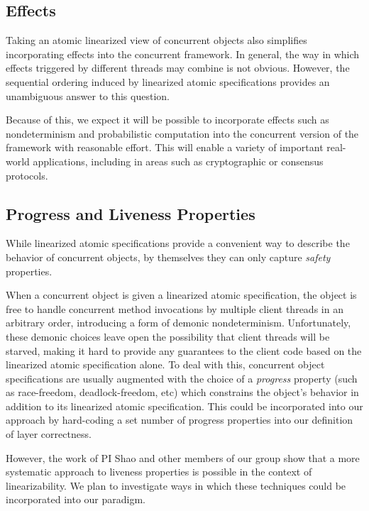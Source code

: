 \subsection{Effects}

Taking an atomic linearized view of concurrent objects
also simplifies incorporating effects into the concurrent framework.
In general,
the way in which effects triggered by different threads may combine
is not obvious.
However,
the sequential ordering induced by linearized atomic specifications
provides an unambiguous answer to this question.

Because of this,
we expect it will be possible to incorporate
effects such as nondeterminism and probabilistic computation
into the concurrent version of the framework
with reasonable effort.
This will enable a variety of important real-world applications,
including in areas such as cryptographic or consensus protocols.


\subsection{Progress and Liveness Properties}

While linearized atomic specifications
provide a convenient way to describe the behavior of concurrent objects,
by themselves they can only capture \emph{safety} properties.

When a concurrent object is given a linearized atomic specification,
the object is free to handle
concurrent method invocations by multiple client threads
in an arbitrary order,
introducing a form of demonic nondeterminism.
Unfortunately,
these demonic choices leave open the possibility that
client threads will be starved,
making it hard to provide any guarantees to the client code
based on the linearized atomic specification alone.
To deal with this,
concurrent object specifications are usually augmented
with the choice of a \emph{progress} property
(such as race-freedom, deadlock-freedom, etc)
which constrains the object's behavior in addition to its
linearized atomic specification.
This could be incorporated into our approach
by hard-coding a set number of progress properties
into our definition of layer correctness.

However,
the work of PI Shao and other members of our group show that
a more systematic approach to liveness properties
is possible in the context of linearizability.
We plan to investigate ways in which these techniques
could be incorporated into our paradigm.

